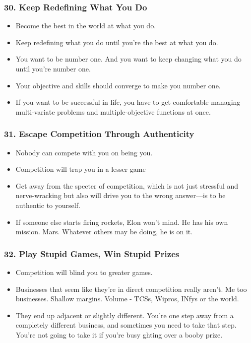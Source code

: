 \begin{frame}[fragile]
\frametitle{30. Keep Redefining What You Do}
\begin{itemize}
\item Become the best in the world at what you do.
\item Keep redefining what you do until you're the best at what you do.
\item You want to be number one. And you want to keep changing what you do until you're number one.
\item Your objective and skills should converge to make you number one.
\item If you want to be successful in life, you have to get comfortable managing multi-variate problems
and multiple-objective functions at once. 
\end{itemize}
\end{frame}

\begin{frame}[fragile]
\frametitle{31. Escape Competition Through Authenticity}
\begin{itemize}
\item Nobody can compete with you on being you.
\item Competition will trap you in a lesser game
\item Get away from the specter of competition, which is not just stressful and nerve-wracking but also will drive you to the wrong answer—is to be authentic to yourself.
\item If someone else starts firing rockets, Elon won't mind. He has his own mission. Mars. Whatever others may be doing, he is on it.
\end{itemize}
\end{frame}


\begin{frame}[fragile]
\frametitle{32. Play Stupid Games, Win Stupid Prizes}
\begin{itemize}
\item Competition will blind you to greater games.
\item Businesses that seem like they're in direct competition really aren't. Me too businesses. Shallow margins. Volume - TCSs, Wipros, INfys or the world.
\item They end up adjacent or slightly
different. You're one step away from a completely different business, and sometimes you need to take
that step. You're not going to take it if you're busy  ghting over a booby prize.
\end{itemize}
\end{frame}

